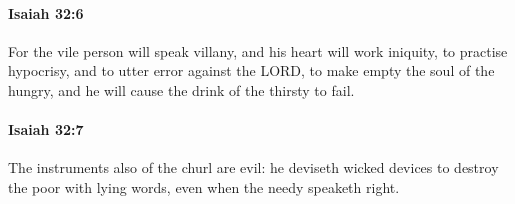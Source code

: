 		\paragraph{Isaiah 32:6} %
			\label{ISAIAH-32-6}

			For the vile person will speak villany, and his heart will work iniquity, to practise hypocrisy, and to utter error against the LORD, to make empty the soul of the hungry, and he will cause the drink of the thirsty to fail.


		\paragraph{Isaiah 32:7} %
			\label{ISAIAH-32-7}

			The instruments also of the churl are evil: he deviseth wicked devices to destroy the poor with lying words, even when the needy speaketh right.


